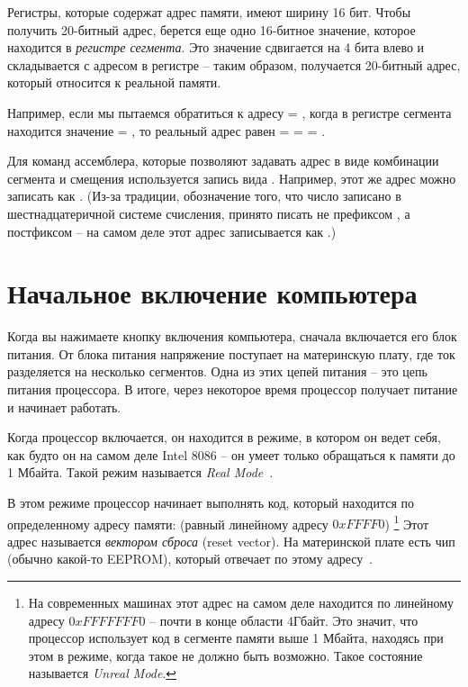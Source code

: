 \documentclass[a4page]{article}
\begin{document}
Регистры, которые содержат адрес памяти, имеют ширину 16 бит.
Чтобы получить 20-битный адрес,
берется еще одно 16-битное значение, которое находится в \emph{регистре сегмента}.
Это значение сдвигается на 4 бита влево и складывается с адресом в регистре --
таким образом, получается 20-битный адрес, который относится к реальной памяти.

Например, если мы пытаемся обратиться к адресу  = ,
когда в регистре сегмента находится значение  = ,
то реальный адрес равен  =
 =  = .

Для команд ассемблера, которые позволяют задавать адрес в виде комбинации сегмента и смещения
используется запись вида .
Например, этот же адрес можно записать как .
(Из-за традиции, обозначение того, что число записано в шестнадцатеричной системе счисления,
принято писать не префиксом , а постфиксом  --
на самом деле этот адрес записывается как .)



\section{Начальное включение компьютера}

Когда вы нажимаете кнопку включения компьютера,
сначала включается его блок питания.
От блока питания напряжение поступает на материнскую плату,
где ток разделяется на несколько сегментов.
Одна из этих цепей питания -- это цепь питания процессора.
В итоге, через некоторое время процессор получает питание и начинает работать.

Когда процессор включается, он находится в режиме,
в котором он ведет себя, как будто он на самом деле Intel 8086 --
он умеет только обращаться к памяти до 1 Мбайта.
Такой режим называется \emph{Real Mode}~\cite{osdev:real}.

В этом режиме процессор начинает выполнять код, который находится по определенному адресу памяти:
 (равный линейному адресу $0xFFFF0$)
\footnote{На современных машинах этот адрес на самом деле находится по линейному адресу $0xFFFFFFF0$ -- почти в конце области 4Гбайт.
Это значит, что процессор использует код в сегменте памяти выше 1 Мбайта,
находясь при этом в режиме, когда такое не должно быть возможно.
Такое состояние называется \emph{Unreal Mode}.}
Этот адрес называется \emph{вектором сброса} (reset vector).
На материнской плате есть чип (обычно какой-то EEPROM), который отвечает по этому адресу~\cite{osdev:sysinit}.
\end{document}
